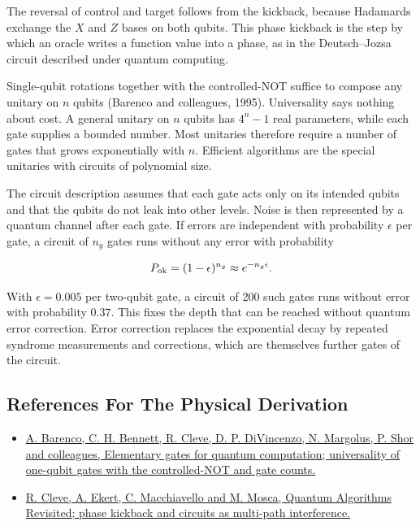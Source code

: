 \documentclass[11pt,oneside]{book}
\newenvironment{centeredalign}{\[\begin{gathered}[c]}{\end{gathered}\]}
\begin{document}
The reversal of control and target follows from the kickback, because Hadamards exchange the \(X\) and \(Z\) bases on both qubits. This phase kickback is the step by which an oracle writes a function value into a phase, as in the Deutsch--Jozsa circuit described under quantum computing.

Single-qubit rotations together with the controlled-NOT suffice to compose any unitary on \(n\) qubits (Barenco and colleagues, 1995). Universality says nothing about cost. A general unitary on \(n\) qubits has \(4^n-1\) real parameters, while each gate supplies a bounded number. Most unitaries therefore require a number of gates that grows exponentially with \(n\). Efficient algorithms are the special unitaries with circuits of polynomial size.

The circuit description assumes that each gate acts only on its intended qubits and that the qubits do not leak into other levels. Noise is then represented by a quantum channel after each gate. If errors are independent with probability \(\epsilon\) per gate, a circuit of \(n_g\) gates runs without any error with probability

\begin{centeredalign}
P_{\rm ok}=(1-\epsilon)^{n_g}\approx e^{-n_g\epsilon}.
\end{centeredalign}

With \(\epsilon=0.005\) per two-qubit gate, a circuit of 200 such gates runs without error with probability \(0.37\). This fixes the depth that can be reached without quantum error correction. Error correction replaces the exponential decay by repeated syndrome measurements and corrections, which are themselves further gates of the circuit.

\subsection*{References For The Physical Derivation}
\begin{itemize}
\item \href{https://arxiv.org/abs/quant-ph/9503016}{A. Barenco, C. H. Bennett, R. Cleve, D. P. DiVincenzo, N. Margolus, P. Shor and colleagues, Elementary gates for quantum computation; universality of one-qubit gates with the controlled-NOT and gate counts.}
\item \href{https://arxiv.org/abs/quant-ph/9708016}{R. Cleve, A. Ekert, C. Macchiavello and M. Mosca, Quantum Algorithms Revisited; phase kickback and circuits as multi-path interference.}
\end{itemize}
\end{document}
